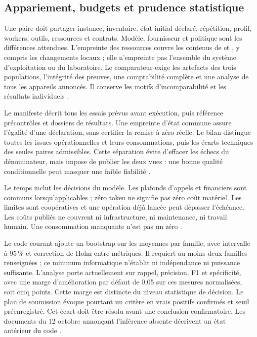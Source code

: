 \documentclass[11pt,a4paper]{article}
\DeclareRobustCommand{\code}[1]{{\small\path{#1}}}
\begin{document}
\subsection{Appariement, budgets et prudence statistique}

Une paire doit partager instance, inventaire, état initial déclaré, répétition,
profil, workers, outils, ressources et contrats. Modèle, fournisseur et politique
sont les différences attendues. L'empreinte des ressources couvre les contenus
de \code{src/agent} et \code{src/benchmark}, y compris les changements locaux ;
elle n'empreinte pas l'ensemble du système d'exploitation ou du laboratoire.
Le comparateur exige les artefacts des trois populations, l'intégrité des
preuves, une comptabilité complète et une analyse de tous les appareils
annoncés. Il conserve les motifs d'incomparabilité et les résultats individuels
\cite{bench-comparateur}.

Le manifeste décrit tous les essais prévus avant exécution, puis référence
précontrôles et dossiers de résultats. Une empreinte d'état commune assure
l'égalité d'une déclaration, sans certifier la remise à zéro réelle.
Le bilan distingue toutes les issues opérationnelles et leurs consommations,
puis les écarts techniques des seules paires admissibles. Cette séparation
évite d'effacer les échecs du dénominateur, mais impose de publier les deux
vues : une bonne qualité conditionnelle peut masquer une faible fiabilité
\cite{bench-campagne,bench-campaign-code}.

Le temps inclut les décisions du modèle. Les plafonds d'appels et financiers
sont communs lorsqu'applicables ; zéro token ne signifie pas zéro coût matériel.
Les limites sont coopératives et une opération déjà lancée peut dépasser
l'échéance. Les coûts publiés ne couvrent ni infrastructure, ni maintenance,
ni travail humain. Une consommation manquante n'est pas un zéro
\cite{bench-cli,bench-campagne}.

Le code courant ajoute un bootstrap sur les moyennes par famille, avec intervalle
à 95\,\% et correction de Holm entre métriques. Il requiert au moins deux
familles renseignées ; ce minimum informatique n'établit ni indépendance ni
puissance suffisante. L'analyse porte actuellement sur rappel, précision, F1
et spécificité, avec une marge d'amélioration par défaut de 0,05 sur ces
mesures normalisées, soit cinq points. Cette marge est distincte du niveau
statistique de décision. Le plan de soumission évoque
pourtant un critère en vrais positifs confirmés et seuil préenregistré.
Cet écart doit être résolu avant une conclusion confirmatoire. Les documents
du 12 octobre annonçant l'inférence absente décrivent un état antérieur du code
\cite{bench-inference,bench-campaign-code,bench-objectif}.
\end{document}
